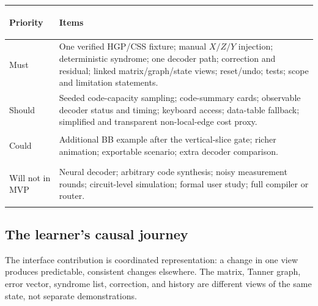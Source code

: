 \documentclass[11pt]{article}
\begin{document}
\begin{center}
\begin{tabularx}{\textwidth}{>{\bfseries\raggedright\arraybackslash}p{}X}
\toprule
Priority & Items \\
\midrule
Must & One verified HGP/CSS fixture; manual \(X/Z/Y\) injection; deterministic syndrome;
one decoder path; correction and residual; linked matrix/graph/state views; reset/undo; tests;
scope and limitation statements. \\
Should & Seeded code-capacity sampling; code-summary cards; observable decoder status and timing;
keyboard access; data-table fallback; simplified and transparent non-local-edge cost proxy. \\
Could & Additional BB example after the vertical-slice gate; richer animation; exportable scenario;
extra decoder comparison. \\
Will not in MVP & Neural decoder; arbitrary code synthesis; noisy measurement rounds;
circuit-level simulation; formal user study; full compiler or router. \\
\bottomrule
\end{tabularx}
\end{center}

\subsection{The learner's causal journey}

\begin{center}
\end{center}

The interface contribution is coordinated representation: a change in one view produces predictable,
consistent changes elsewhere. The matrix, Tanner graph, error vector, syndrome list, correction, and
history are different views of the same state, not separate demonstrations.
\end{document}
